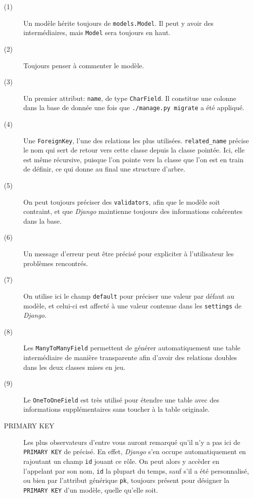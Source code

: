 \documentclass[a4paper]{report}
\begin{document}
\begin{description}
    \item[(1)] Un modèle hérite toujours de \verb#models.Model#. Il peut y avoir des intermédiaires, mais \verb#Model#
        sera toujours en haut.
    \item[(2)] Toujours penser à commenter le modèle.
    \item[(3)] Un premier attribut: \verb#name#, de type \verb#CharField#. Il constitue une colonne dans la base de
        donnée une fois que \verb#./manage.py migrate# a été appliqué.
    \item[(4)] Une \verb#ForeignKey#, l'une des relations les plus utilisées. \verb#related_name# précise le nom qui sert
        de retour vers cette classe depuis la classe pointée. Ici, elle est même récursive, puisque l'on pointe vers la
        classe que l'on est en train de définir, ce qui donne au final une structure d'arbre.
    \item[(5)] On peut toujours préciser des \verb#validators#, afin que le modèle soit contraint, et que \emph{Django}
        maintienne toujours des informations cohérentes dans la base.
    \item[(6)] Un message d'erreur peut être précisé pour expliciter à l'utilisateur les problèmes rencontrés.
    \item[(7)] On utilise ici le champ \verb#default# pour préciser une valeur par défaut au modèle, et celui-ci est
        affecté à une valeur contenue dans les \verb#settings# de \emph{Django}.
    \item[(8)] Les \verb#ManyToManyField# permettent de générer automatiquement une table intermédiaire de manière
        transparente afin d'avoir des relations doubles dans les deux classes mises en jeu.
    \item[(9)] Le \verb#OneToOneField# est très utilisé pour étendre une table avec des informations supplémentaires
        sans toucher à la table originale.
    \item[PRIMARY KEY] Les plus observateurs d'entre vous auront remarqué qu'il n'y a pas ici de \verb#PRIMARY KEY# de précisé. En
        effet, \emph{Django} s'en occupe automatiquement en rajoutant un champ \verb#id# jouant ce rôle. On peut alors y
        accèder en l'appelant par son nom, \verb#id# la plupart du temps, sauf s'il a été personnalisé, ou bien par
        l'attribut générique \verb#pk#, toujours présent pour désigner la \verb#PRIMARY KEY# d'un modèle, quelle qu'elle
        soit.
\end{description}
\end{document}
